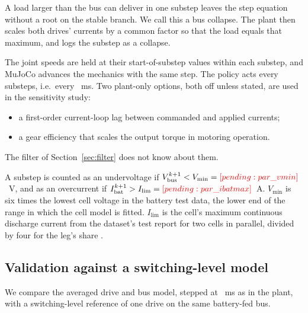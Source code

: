 A load larger than the bus can deliver in one substep leaves the step equation without a root on the stable branch. We call this a bus collapse. The plant then scales both drives' currents by a common factor so that the load equals that maximum, and logs the substep as a collapse.

The joint speeds are held at their start-of-substep values within each substep, and MuJoCo \cite{todorov2012mujoco} advances the mechanics with the same step. The policy acts every  substeps, i.e.\ every ~ms. Two plant-only options, both off unless stated, are used in the sensitivity study:
\begin{itemize}
\item a first-order current-loop lag between commanded and applied currents;
\item a gear efficiency that scales the output torque in motoring operation.
\end{itemize}
The filter of Section~\ref{sec:filter} does not know about them.

A substep is counted as an undervoltage if $\Vb^{k+1} < V_{\min} = \res{par_vmin}$~V, and as an overcurrent if $\Ib^{k+1} > I_{\lim} = \res{par_ibatmax}$~A. $V_{\min}$ is six times the lowest cell voltage in the battery test data, the lower end of the range in which the cell model is fitted. $I_{\lim}$ is the cell's maximum continuous discharge current from the dataset's test report for two cells in parallel, divided by four for the leg's share \cite{kollmeyer2020hg2}.
\begin{table}[tbp]\centering\caption{Model parameters, generated from the code: symbol in the text (a short name where the text uses none), value, unit, provenance status and source, with the printed page where the source gives one. Status: VERIFIED and SOURCED, taken from the cited source; DERIVED, computed from sourced values or fitted to the public battery data (``fit to''); ASSUMED, no source, with the reason in the Source column; FIXED (training), the reference of the policy's bus-voltage observation, not a physical parameter. The field name of each parameter in the code, the full reasons and the section or table of each source are given in the provenance file released with the code.}\label{tab:params}
{\small{}}
\end{table}

\subsection{Validation against a switching-level model}\label{sec:validation}
We compare the averaged drive and bus model, stepped at ~ms as in the plant, with a switching-level reference of one drive on the same battery-fed bus.

